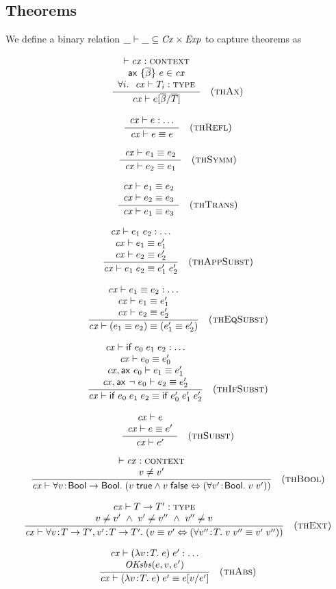 \subsection{Theorems}

We define a binary relation $\_\vdash\_\subseteq\mathit{Cx}\times\mathit{Exp}$ to capture theorems
as

\[
\frac{\begin{array}{c}\vdash\mathit{cx}:\textsc{context}\\\mathsf{ax}\ \{\overline{\beta}\}\ e\in\mathit{cx}\\\forall i.\ \ \mathit{cx}\vdash T_i:\textsc{type}\end{array}}{\mathit{cx}\vdash e[\overline{\beta}/\overline{T}]}\quad\mbox{(\textsc{thAx})}
\]

\[
\frac{\begin{array}{c}\mathit{cx}\vdash e:\ldots\end{array}}{\mathit{cx}\vdash e\equiv e}\quad\mbox{(\textsc{thRefl})}
\]

\[
\frac{\begin{array}{c}\mathit{cx}\vdash e_1\equiv e_2\end{array}}{\mathit{cx}\vdash e_2\equiv e_1}\quad\mbox{(\textsc{thSymm})}
\]

\[
\frac{\begin{array}{c}\mathit{cx}\vdash e_1\equiv e_2\\\mathit{cx}\vdash e_2\equiv e_3\end{array}}{\mathit{cx}\vdash e_1\equiv e_3}\quad\mbox{(\textsc{thTrans})}
\]

\[
\frac{\begin{array}{c}\mathit{cx}\vdash e_1\;e_2:\ldots\\\mathit{cx}\vdash e_1\equiv e_1'\\\mathit{cx}\vdash e_2\equiv e_2'\end{array}}{\mathit{cx}\vdash e_1\;e_2\equiv e_1'\;e_2'}\quad\mbox{(\textsc{thAppSubst})}
\]

\[
\frac{\begin{array}{c}\mathit{cx}\vdash e_1\equiv e_2:\ldots\\\mathit{cx}\vdash e_1\equiv e_1'\\\mathit{cx}\vdash e_2\equiv e_2'\end{array}}{\mathit{cx}\vdash(e_1\equiv e_2)\equiv(e_1'\equiv e_2')}\quad\mbox{(\textsc{thEqSubst})}
\]

\[
\frac{\begin{array}{c}\mathit{cx}\vdash\mathsf{if}\;e_0\;e_1\;e_2:\ldots\\\mathit{cx}\vdash e_0\equiv e_0'\\\mathit{cx},\mathsf{ax}\ e_0\vdash e_1\equiv e_1'\\\mathit{cx},\mathsf{ax}\ \neg\;e_0\vdash e_2\equiv e_2'\end{array}}{\mathit{cx}\vdash\mathsf{if}\;e_0\;e_1\;e_2\equiv\mathsf{if}\;e_0'\;e_1'\;e_2'}\quad\mbox{(\textsc{thIfSubst})}
\]

\[
\frac{\begin{array}{c}\mathit{cx}\vdash e\\\mathit{cx}\vdash e\equiv e'\end{array}}{\mathit{cx}\vdash e'}\quad\mbox{(\textsc{thSubst})}
\]

\[
\frac{\begin{array}{c}\vdash\mathit{cx}:\textsc{context}\\v\neq v'\end{array}}{\mathit{cx}\vdash\forall v\!:\!\mathsf{Bool}\to\mathsf{Bool}.\;(v\;\mathsf{true}\wedge v\;\mathsf{false}\Leftrightarrow(\forall v'\!:\!\mathsf{Bool}.\;v\;v'))}\quad\mbox{(\textsc{thBool})}
\]

\[
\frac{\begin{array}{c}\mathit{cx}\vdash T\to T':\textsc{type}\\v\neq v'\ \wedge\ v'\neq v''\ \wedge\ v''\neq v\end{array}}{\mathit{cx}\vdash\forall v\!:\!T\to T',v'\!:\!T\to T'.\;(v\equiv v'\Leftrightarrow(\forall v''\!:\!T.\;v\;v''\equiv v'\;v''))}\quad\mbox{(\textsc{thExt})}
\]

\[
\frac{\begin{array}{c}\mathit{cx}\vdash(\lambda v\!:\!T.\;e)\;e':\ldots\\\mathit{OKsbs}(e,v,e')\end{array}}{\mathit{cx}\vdash(\lambda v\!:\!T.\;e)\;e'\equiv e[v/e']}\quad\mbox{(\textsc{thAbs})}
\]

